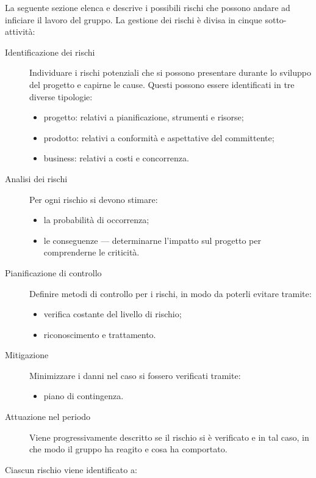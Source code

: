 La seguente sezione elenca e descrive i possibili rischi che possono andare ad inficiare il lavoro del gruppo. La gestione dei rischi è divisa in cinque sotto-attività:
\begin{description}
	\item[Identificazione dei rischi] Individuare i rischi potenziali che si possono presentare durante lo sviluppo del progetto e capirne le cause. Questi possono essere identificati in tre diverse tipologie:
	\begin{itemize}
		\item progetto: relativi a pianificazione, strumenti e risorse;
		\item prodotto: relativi a conformità e aspettative del committente;
		\item business: relativi a costi e concorrenza.
	\end{itemize}
	\item[Analisi dei rischi] Per ogni rischio si devono stimare:
	\begin{itemize}
		\item la probabilità di occorrenza;
		\item le conseguenze --- determinarne l'impatto sul progetto per comprenderne le criticità.
	\end{itemize}
	\item[Pianificazione di controllo] Definire metodi di controllo per i rischi, in modo da poterli evitare tramite:
	\begin{itemize}
		\item verifica costante del livello di rischio;
		\item riconoscimento e trattamento.
	\end{itemize}
	\item[Mitigazione] Minimizzare i danni nel caso si fossero verificati tramite:
	\begin{itemize}
		\item piano di contingenza.
	\end{itemize}
	\item[Attuazione nel periodo] Viene progressivamente descritto se il rischio si è verificato e in tal caso, in che modo il gruppo ha reagito e cosa ha comportato.
\end{description}
Ciascun rischio viene identificato a:
